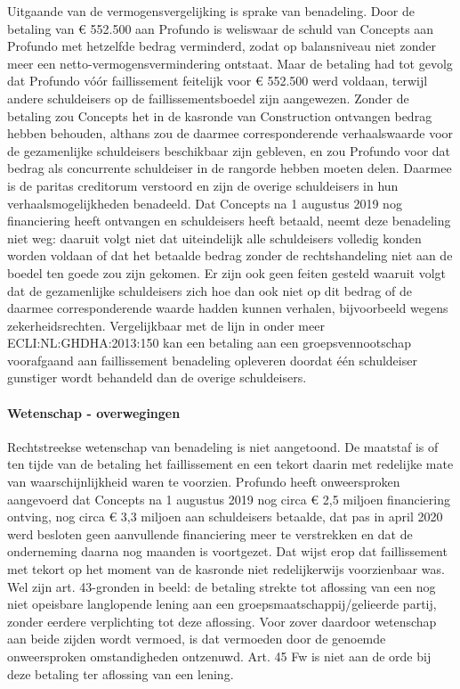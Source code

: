\documentclass[
  dutch,
  a4paper,
]{article}
\begin{document}
Uitgaande van de vermogensvergelijking is sprake van benadeling. Door de betaling van € 552.500 aan Profundo is weliswaar de schuld van Concepts aan Profundo met hetzelfde bedrag verminderd, zodat op balansniveau niet zonder meer een netto-vermogensvermindering ontstaat. Maar de betaling had tot gevolg dat Profundo vóór faillissement feitelijk voor € 552.500 werd voldaan, terwijl andere schuldeisers op de faillissementsboedel zijn aangewezen. Zonder de betaling zou Concepts het in de kasronde van Construction ontvangen bedrag hebben behouden, althans zou de daarmee corresponderende verhaalswaarde voor de gezamenlijke schuldeisers beschikbaar zijn gebleven, en zou Profundo voor dat bedrag als concurrente schuldeiser in de rangorde hebben moeten delen. Daarmee is de paritas creditorum verstoord en zijn de overige schuldeisers in hun verhaalsmogelijkheden benadeeld. Dat Concepts na 1 augustus 2019 nog financiering heeft ontvangen en schuldeisers heeft betaald, neemt deze benadeling niet weg: daaruit volgt niet dat uiteindelijk alle schuldeisers volledig konden worden voldaan of dat het betaalde bedrag zonder de rechtshandeling niet aan de boedel ten goede zou zijn gekomen. Er zijn ook geen feiten gesteld waaruit volgt dat de gezamenlijke schuldeisers zich hoe dan ook niet op dit bedrag of de daarmee corresponderende waarde hadden kunnen verhalen, bijvoorbeeld wegens zekerheidsrechten. Vergelijkbaar met de lijn in onder meer ECLI:NL:GHDHA:2013:150 kan een betaling aan een groepsvennootschap voorafgaand aan faillissement benadeling opleveren doordat één schuldeiser gunstiger wordt behandeld dan de overige schuldeisers.

\paragraph{Wetenschap - overwegingen}\label{wetenschap---overwegingen-40}

Rechtstreekse wetenschap van benadeling is niet aangetoond. De maatstaf is of ten tijde van de betaling het faillissement en een tekort daarin met redelijke mate van waarschijnlijkheid waren te voorzien. Profundo heeft onweersproken aangevoerd dat Concepts na 1 augustus 2019 nog circa € 2,5 miljoen financiering ontving, nog circa € 3,3 miljoen aan schuldeisers betaalde, dat pas in april 2020 werd besloten geen aanvullende financiering meer te verstrekken en dat de onderneming daarna nog maanden is voortgezet. Dat wijst erop dat faillissement met tekort op het moment van de kasronde niet redelijkerwijs voorzienbaar was. Wel zijn art. 43-gronden in beeld: de betaling strekte tot aflossing van een nog niet opeisbare langlopende lening aan een groepsmaatschappij/gelieerde partij, zonder eerdere verplichting tot deze aflossing. Voor zover daardoor wetenschap aan beide zijden wordt vermoed, is dat vermoeden door de genoemde onweersproken omstandigheden ontzenuwd. Art. 45 Fw is niet aan de orde bij deze betaling ter aflossing van een lening.
\end{document}

